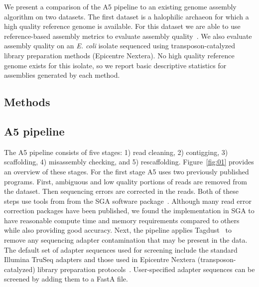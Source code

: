 \documentclass{bioinfo}
\begin{document}
We present a comparison of the A5 pipeline to an existing genome assembly algorithm on two datasets. The first dataset
is a halophilic archaeon for which a high quality reference genome is available. For this dataset we are able to use
reference-based assembly metrics to evaluate assembly quality~\citep{Darling2011}. We also evaluate assembly quality on an 
\textit{E. coli} isolate sequenced using transposon-catalyzed library preparation methods (Epicentre Nextera). 
No high quality reference genome exists for this isolate, so we report basic descriptive statistics for assemblies
generated by each method.  

\begin{methods}
\section{Methods}

\subsection{A5 pipeline}

The A5 pipeline consists of five stages: 1) read cleaning, 2) contigging, 3) scaffolding,
4) misassembly checking, and 5) rescaffolding. Figure~\ref{fig:01} provides an overview of these stages. 
For the first stage A5 uses two previously
published programs. First, ambiguous and low quality portions of reads are removed from the dataset. Then sequencing errors are corrected in the reads.
Both of these steps use tools from 
from the SGA software package~\citep{Simpson2010}.  Although many read error correction packages have been published,
we found the implementation in SGA to have reasonable compute time and memory requirements compared to others while also providing 
good accuracy.  Next, the pipeline applies Tagdust~\citep{tagdust} to remove any 
sequencing adapter contamination that may be present in the data. The default set of adapter sequences used for screening
include the standard Illumina TruSeq adapters and those used in Epicentre Nextera (transposon-catalyzed) library preparation protocols~\citep{Adey2010}. 
User-specified adapter sequences can be screened by adding them to a FastA file. 


\end{methods}
\end{document}
